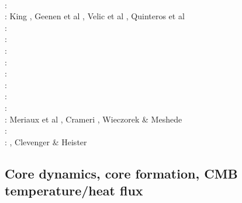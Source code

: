 \begin{scriptsize}
      \cite{zldf07}\\
\twothousandeight: \cite{zhmt08}\cite{deka08}\cite{trub08}\cite{krdp08}\cite{mamo08}\cite{gepd98}
      \cite{vack08}\cite{heta08}\cite{brtf08}\cite{daks08}\cite{chzy08}\cite{tack08}\cite{hust08b}\\
\twothousandnine: King \cite{king09}, Geenen et al \cite{geum09}, Velic et al \cite{vemm09}, 
                  Quinteros et al \cite{qurj09}\\
\twothousandten: \cite{kaus10}\cite{kamm10}\cite{egat10}\cite{kilv10}\\
\twothousandeleven: \cite{dumg11}\cite{uibb11}\cite{hegc11}\cite{muso11}\cite{dawk11}\cite{lemm11}\\
\twothousandtwelve: \cite{crsg12}\cite{chgv12}\cite{krwd12}\cite{may12}\cite{gerb12}\cite{asmo12}\\
\twothousandthirteen: \cite{chtl13}\cite{kemk13}\cite{gemd13}\cite{hutm13}\\
\twothousandfourteen: \cite{thmk14}\cite{mabl14}\cite{lopp14}\cite{stlh14}\\
\twothousandfifteen: \cite{lelk15}\cite{rumi15}\cite{chpe15}\cite{mabl15}\\
\twothousandsixteen: \cite{dumy16}\cite{blmp16}\\
\twothousandseventeen: \cite{robh17}\cite{wisv17}\cite{majc17}\\
\twothousandeighteen: Meriaux et al \cite{memm18}, Crameri \cite{cram18}, Wieczorek \& Meshede \cite{wime18}\\
\twothousandnineteen: \cite{liki19}\cite{demh19}\cite{galb19}\cite{frtv19}\cite{yuwa19}\cite{ropu19}\\
\twothousandtwenty: \cite{homb20}\cite{trlb20}\cite{gadb20}\cite{jaca20a,jaca20b}, Clevenger \& Heister \cite{clhe20}
\end{scriptsize}

\subsection{Core dynamics, core formation, CMB temperature/heat flux}

